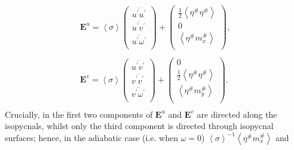 \documentclass[12pt,a4paper]{report}
\newcommand*\thkmean[1]{\overline{#1}}
\newcommand*\thkres[1]{{#1}^{\prime}}
\newcommand*\nthkmean[1]{\left\langle{#1}\right\rangle}
\newcommand*\nthkres[1]{{#1}^{\#}}
\newcommand*{\half}{\frac{1}{2}}
\begin{document}
\begin{subequations}
\begin{equation}
\begin{array}{c}
                   \boldsymbol{E}^{u}=\nthkmean{\sigma}\left(
                   \begin{array}{c}
                   \thkmean{\thkres{u}\thkres{u}} \\
                   \thkmean{\thkres{u}\thkres{v}} \\
                    \thkmean{\thkres{u}\thkres{\omega}} \\
                   \end{array}\right)+\left(
                   \begin{array}{c}
                   \half \nthkmean{\nthkres{\eta}\nthkres{\eta}} \\
                   0 \\
                   \nthkmean{\nthkres{\eta}\nthkres{m}_{x}} \\
                   \end{array}\right), \\ \\
                   \boldsymbol{E}^{v}=\nthkmean{\sigma}\left(
                   \begin{array}{c}
                   \thkmean{\thkres{u}\thkres{v}} \\
                   \thkmean{\thkres{v}\thkres{v}} \\
                   \thkmean{\thkres{v}\thkres{\omega}} \\
                   \end{array}\right)+\left(
                   \begin{array}{c}
                   0\\
                   \half \nthkmean{\nthkres{\eta}\nthkres{\eta}} \\
                   \nthkmean{\nthkres{\eta}\nthkres{m}_{y}} \\
                   \end{array}\right). \\
                   \end{array}
                   \end{equation}
                \end{subequations}
                   Crucially, in \cite{young2012exact} the first two components of  $\boldsymbol{E}^{u}$ and $\boldsymbol{E}^{v}$ are directed along 
                   the isopycnals, whilst only  the third component is directed through 
                   isopycnal surfaces; hence, in the adiabatic case (i.e. when $\omega=0$)
                   $ \nthkmean{\sigma}^{-1}\nthkmean{\nthkres{\eta}\nthkres{m}_{x}}$ and 
\end{document}
